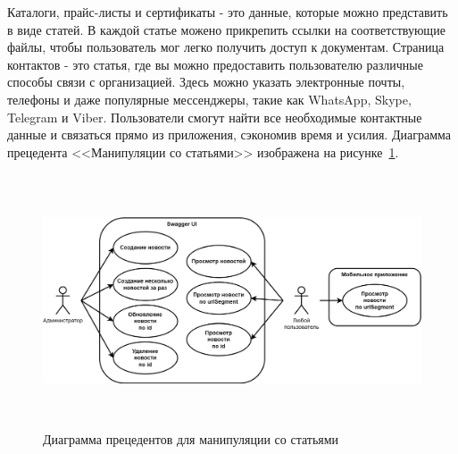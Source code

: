 Каталоги, прайс-листы и сертификаты - это данные, которые можно представить в виде статей.
В каждой статье можено прикрепить ссылки на соответствующие файлы,
чтобы пользователь мог легко получить доступ к документам.
Страница контактов - это статья, где вы можно предоставить пользователю различные способы связи с организацией.
Здесь можно указать электронные почты, телефоны и даже популярные мессенджеры, такие как WhatsApp, Skype, Telegram и Viber.
Пользователи смогут найти все необходимые контактные данные и связаться прямо из приложения, сэкономив время и усилия.
Диаграмма прецедента <<Манипуляции со статьями>> изображена на рисунке~\ref{fig:UML_precedent_articles}.

\begin{figure}[!htb]
    \centering

    \includegraphics[height=7.5cm]
    {images/UML/UML_precedent_articles.png}

    \caption{Диаграмма прецедентов для манипуляции со статьями}

    \label{fig:UML_precedent_articles}
\end{figure}





